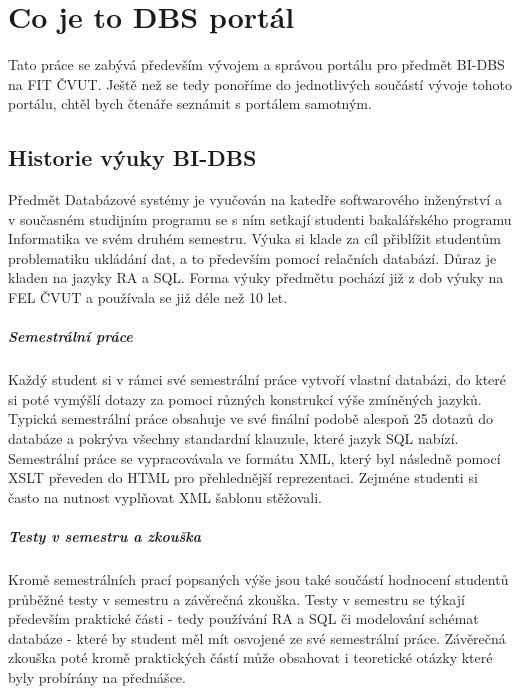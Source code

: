 \chapter{Co je to DBS portál} \label{DBSportal}

Tato práce se zabývá především vývojem a správou portálu pro předmět BI-DBS na FIT ČVUT. Ještě než se tedy ponoříme do jednotlivých součástí vývoje tohoto portálu, chtěl bych čtenáře seznámit s portálem samotným.

\section{Historie výuky BI-DBS}

Předmět Databázové systémy je vyučován na katedře softwarového inženýrství a v současném studijním programu se s ním setkají studenti bakalářského programu Informatika ve svém druhém semestru. Výuka si klade za cíl přiblížit studentům problematiku ukládání dat, a to především pomocí relačních databází. Důraz je kladen na jazyky RA a SQL. Forma výuky předmětu pochází již z dob výuky na FEL ČVUT a používala se již déle než 10 let.

\paragraph{Semestrální práce}
Každý student si v rámci své semestrální práce vytvoří vlastní databázi, do které si poté vymýšlí dotazy za pomoci různých konstrukcí výše zmíněných jazyků. Typická semestrální práce obsahuje ve své finální podobě alespoň 25 dotazů do databáze a pokrýva všechny standardní klauzule, které jazyk SQL nabízí. Semestrální práce se vypracovávala ve formátu XML, který byl následně pomocí XSLT převeden do HTML pro přehlednější reprezentaci. Zejméne studenti si často na nutnost vyplňovat XML šablonu stěžovali.

\paragraph{Testy v semestru a zkouška}
Kromě semestrálních prací popsaných výše jsou také součástí hodnocení studentů průběžné testy v semestru a závěrečná zkouška. Testy v semestru se týkají především praktické části - tedy používání RA a SQL či modelování schémat databáze - které by student měl mít osvojené ze své semestrální práce. Závěrečná zkouška poté kromě praktických částí může obsahovat i teoretické otázky které byly probírány na přednášce.

